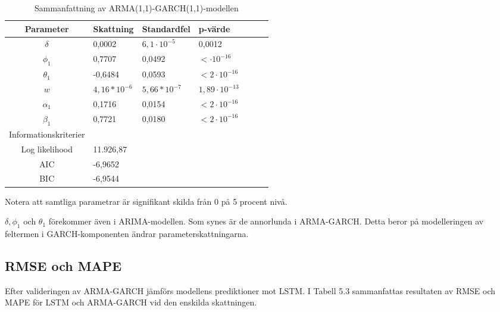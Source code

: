 \documentclass[11pt]{article}
\numberwithin{equation}{section}
\numberwithin{table}{section}
\numberwithin{figure}{section}
\begin{document}
\begin{table}[H]
\caption{Sammanfattning av ARMA(1,1)-GARCH(1,1)-modellen}
\begin{tabularx}{\textwidth}{c *{6}{Y}}
\toprule
Parameter  & Skattning & Standardfel & p-värde \\
\hline

$\delta$      & 0,0002         & $6,1\cdot10^{-5}$ & 0,0012           \\
$\phi_1$      & 0,7707         & 0,0492         & $<\cdot10^{-16}$    \\

$\theta_1$    & -0,6484        & 0,0593         & $<2\cdot10^{-16}$    \\
$w$           & $4,16*10^{-6}$ & $5,66*10^{-7}$ & $1,89\cdot10^{-13}$  \\

$\alpha_1$    & 0,1716         & 0,0154         & $<2\cdot10^{-16}$    \\
$\beta_1$     & 0,7721         & 0,0180         & $<2\cdot10^{-16}$    \\ 
\midrule

Informationskriterier  & &  &  \\
\hline

Log likelihood & 11.926,87       &                &                  \\
AIC            & -6,9652        &                &                   \\

BIC            & -6,9544         &                &                   \\
\bottomrule
\end{tabularx}
\footnotesize{Notera att samtliga parametrar är signifikant skilda från 0 på 5 procent nivå.}
\end{table}






$\delta, \phi_1$ och $\theta_1$ förekommer även i ARIMA-modellen. Som synes är de annorlunda i ARMA-GARCH. Detta beror på modelleringen av feltermen i GARCH-komponenten ändrar parameterskattningarna.

\subsection{RMSE och MAPE}
Efter valideringen av ARMA-GARCH jämförs modellens prediktioner mot LSTM. I Tabell 5.3 sammanfattas resultaten av RMSE och MAPE för LSTM och ARMA-GARCH vid den enskilda skattningen.
\end{document}
